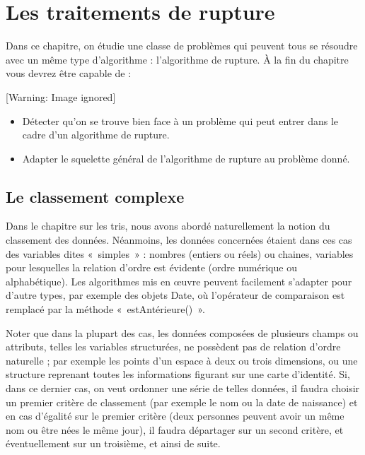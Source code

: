 
\chapter[Les traitements de rupture]{
Les traitements de rupture}
{
Dans ce chapitre, on étudie une classe de problèmes qui peuvent tous se
résoudre avec un même type d'algorithme :
l'algorithme de rupture. À la fin du chapitre vous
devrez être capable de :}

\begin{center}
 [Warning: Image ignored] %

\end{center}
\liststyleListv
\begin{itemize}
\item {
Détecter qu'on se trouve bien face à un problème qui
peut entrer dans le cadre d'un algorithme de rupture.}
\item {
Adapter le squelette général de l'algorithme de rupture
au problème donné.}
\end{itemize}
\section{Le classement complexe}
{
Dans le chapitre sur les tris, nous avons abordé naturellement la notion
du classement des données. Néanmoins, les données concernées étaient
dans ces cas des variables dites «~simples~» : nombres (entiers ou
réels) ou chaines, variables pour lesquelles la relation d’ordre est
évidente (ordre numérique ou alphabétique). Les algorithmes mis en
œuvre peuvent facilement s’adapter pour d’autre types, par exemple des
objets Date, où l’opérateur de comparaison est remplacé par la méthode
«~estAntérieure()~».}

{
Noter que dans la plupart des cas, les données composées de plusieurs
champs ou attributs, telles les variables structurées, ne possèdent pas
de relation d’ordre naturelle ; par exemple les points d’un espace à
deux ou trois dimensions, ou une structure reprenant toutes les
informations figurant sur une carte d’identité. Si, dans ce dernier
cas, on veut ordonner une série de telles données, il faudra choisir un
premier critère de classement (par exemple le nom ou la date de
naissance) et en cas d’égalité sur le premier critère (deux personnes
peuvent avoir un même nom ou être nées le même jour), il faudra
départager sur un second critère, et éventuellement sur un troisième,
et ainsi de suite.}

